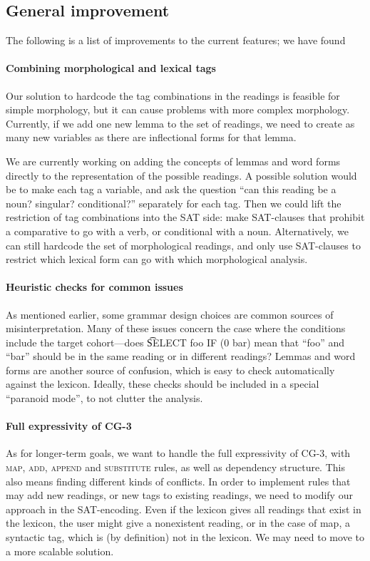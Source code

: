 \subsection{General improvement}

The following is a list of improvements to the current features; we have found 

\paragraph{Combining morphological and lexical tags}

Our solution to hardcode the tag combinations in the readings is
feasible for simple morphology, but it can cause problems with more
complex morphology.
Currently, if we add one new lemma to the set of readings, we need to
create as many new variables as there are inflectional forms
for that lemma. %

We are currently working on adding the concepts of lemmas and word
forms directly to the representation of the possible readings.
A possible solution would be to make each tag a variable, and ask the
question ``can this reading be a noun? singular? 
conditional?'' separately for each tag. Then we could lift the
restriction of tag combinations into the SAT side: make SAT-clauses
that prohibit a comparative to go with a verb, or conditional with a noun.
Alternatively, we can still hardcode the set of morphological readings, and 
only use SAT-clauses to restrict which lexical form can go with which morphological analysis.

\paragraph{Heuristic checks for common issues} 
As mentioned earlier, some grammar design choices  
are common sources of misinterpretation.
Many of these issues concern the case where the conditions include 
the target cohort---does \t{SELECT foo IF (0 bar)} mean that ``foo'' and ``bar'' 
should be in the same reading or in different readings? 
Lemmas and word forms are another source of confusion, which is easy to check automatically against the lexicon. Ideally, these checks should be included in a special ``paranoid mode'', to not clutter the analysis.


\paragraph{Full expressivity of CG-3}
As for longer-term goals, we want to handle the full expressivity of CG-3,
with \textsc{map}, \textsc{add},  \textsc{append} and
\textsc{substitute} rules, as well as dependency structure. 
This also means finding different kinds of conflicts.
In order to implement rules that may add new readings, or new tags to
existing readings, we need to modify our approach in the SAT-encoding.
Even if the lexicon gives all readings that exist in the lexicon, the
user might give a nonexistent reading, or in the case of {\sc map}, a
syntactic tag, which is (by definition) not in the lexicon. We may need to move
to a more scalable solution.


